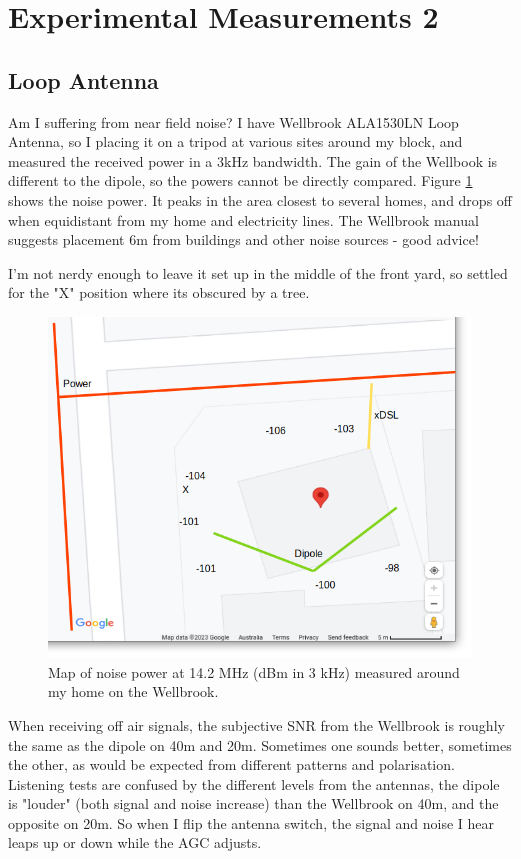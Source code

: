 \documentclass{article}
\begin{document}
\section{Experimental Measurements 2}

\subsection{Loop Antenna}

Am I suffering from near field noise? I have Wellbrook ALA1530LN Loop Antenna, so I placing it on a tripod at various sites around my block, and measured the received power in a 3kHz bandwidth. The gain of the Wellbook is different to the dipole, so the powers cannot be directly compared.  Figure \ref{fig:home_map_loop} shows the noise power.  It peaks in the area closest to several homes, and drops off when equidistant from my home and electricity lines.  The Wellbrook manual suggests placement 6m from buildings and other noise sources - good advice!

I'm not nerdy enough to leave it set up in the middle of the front yard, so settled for the "X" position where its obscured by a tree.

\begin{figure}[h]
\caption{Map of noise power at 14.2 MHz (dBm in 3 kHz) measured around my home on the Wellbrook.}
\label{fig:home_map_loop}
\begin{center}
\includegraphics[width=12cm]{house_map_loop.png}
\end{center}
\end{figure}

When receiving off air signals, the subjective SNR from the Wellbrook is roughly the same as the dipole on 40m and 20m.  Sometimes one sounds better, sometimes the other, as would be expected from different patterns and polarisation.  Listening tests are confused by the different levels from the antennas, the dipole is "louder" (both signal and noise increase) than the Wellbrook on 40m, and the opposite on 20m.  So when I flip the antenna switch, the signal and noise I hear leaps up or down while the AGC adjusts.
\end{document}
